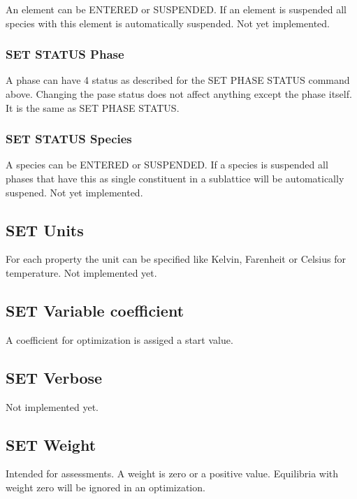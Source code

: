 \documentclass[12pt]{article}
\begin{document}
An element can be ENTERED or SUSPENDED.  If an element is suspended
all species with this element is automatically suspended.  Not yet
implemented.

\subsubsection{SET STATUS Phase}

A phase can have 4 status as described for the SET PHASE STATUS
command above.  Changing the pase status does not affect anything
except the phase itself.  It is the same as SET PHASE STATUS.

\subsubsection{SET STATUS Species}

A species can be ENTERED or SUSPENDED.  If a species is suspended
all phases that have this as single constituent in a sublattice
will be automatically suspened.  Not yet implemented.

\subsection{SET Units}

For each property the unit can be specified like Kelvin, Farenheit or
Celsius for temperature.  Not implemented yet.

\subsection{SET Variable coefficient}

A coefficient for optimization is assiged a start value.

\subsection{SET Verbose}

Not implemented yet.

\subsection{SET Weight}

Intended for assessments.  A weight is zero or a positive value.
Equilibria with weight zero will be ignored in an optimization.  
\end{document}
